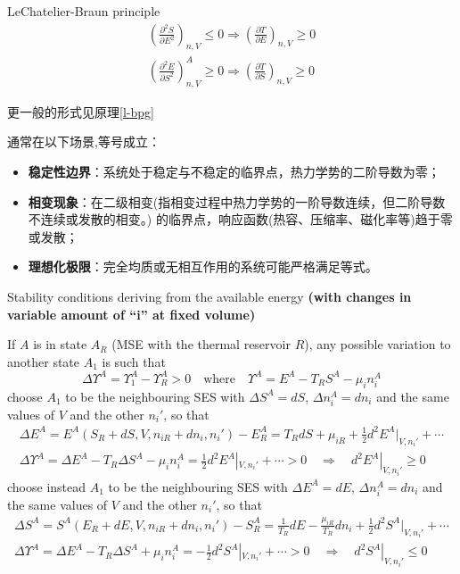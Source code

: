 \begin{principle}\label{l-bp}
    LeChatelier-Braun principle
\begin{gather*}
    \left( \frac{\partial^2 S}{\partial E^2} \right)_{n,V} \leq 0 \Rightarrow \left( \frac{\partial T}{\partial E} \right)_{n,V} \geq 0
    \\
    \left( \frac{\partial^2 E}{\partial S^2} \right)_{n,V}^A \geq 0 \Rightarrow \left( \frac{\partial T}{\partial S} \right)_{n,V} \geq 0
\end{gather*}
\begin{zhu}
    更一般的形式见原理\ref{l-bpg}
\end{zhu}
\begin{zhu}
    通常在以下场景,等号成立：
\begin{itemize}
    \item \textbf{稳定性边界}：系统处于稳定与不稳定的临界点，热力学势的二阶导数为零；
    \item \textbf{相变现象}：在二级相变(指相变过程中热力学势的一阶导数连续，但二阶导数不连续或发散的相变。)
    的临界点，响应函数(热容、压缩率、磁化率等)趋于零或发散；
    \item \textbf{理想化极限}：完全均质或无相互作用的系统可能严格满足等式。
\end{itemize}
\end{zhu}
\end{principle}
\begin{thm}
    Stability conditions deriving from the available energy 
    \textbf{(with changes in \textcolor{b1}{variable amount} of “i” at fixed volume)}

If \( A \) is in state \( A_R \) (MSE with the thermal reservoir \( R \)), any possible variation to another state \( A_1 \) is such that  
\[
\Delta \Upsilon^A = \Upsilon_1^A - \Upsilon_R^A > 0 \quad \text{where} \quad \Upsilon^A = E^A - T_R S^A - \mu_i n_i^A
\]  
choose \( A_1 \) to be the neighbouring SES with \(\Delta S^A = dS\), 
\(\Delta n_i^A = dn_i\) and the same values of \( V \) and 
the other \( n_i' \), so that  
\begin{gather*}
    \Delta E^A = E^A(S_R + dS, V, n_{iR} + dn_i, n_i') - E_R^A 
    = T_R dS + \mu_{iR }+ \frac{1}{2} d^2 E^A |_{V, n_i'} + \cdots
    \\
    \Delta \Upsilon^A = \Delta E^A - T_R \Delta S^A - \mu_i n_i^A 
    = \frac{1}{2} d^2 E^A |_{V, n_i'} + \cdots > 0 
    \quad \Rightarrow \quad d^2 E^A |_{V, n_i'} \geq 0
\end{gather*}
choose instead \( A_1 \) to be the neighbouring SES with \(\Delta E^A = dE\), 
\(\Delta n_i^A = dn_i\) and the same values of \( V \) and 
the other \( n_i' \), so that  
\begin{gather*}
    \Delta S^A = S^A(E_R + dE, V, n_{iR} + dn_i, n_i') - S_R^A 
    = \frac{1}{T_R} dE - \frac{\mu_{iR }}{T_R} dn_i 
    + \frac{1}{2} d^2 S^A |_{V, n_i'} + \cdots
    \\
    \Delta \Upsilon^A = \Delta E^A - T_R \Delta S^A + \mu_i n_i^A = -\frac{1}{2} d^2 S^A |_{V, n_i'} + \cdots > 0 \quad \Rightarrow \quad d^2 S^A |_{V, n_i'} \leq 0
\end{gather*}
\end{thm}

